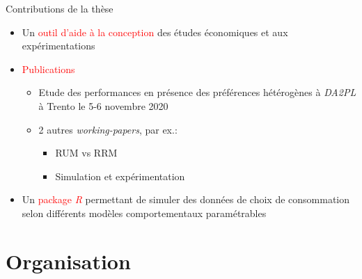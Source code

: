 \documentclass[11pt,ignorenonframetext,]{beamer}
\providecommand{\tightlist}{%
  \setlength{\itemsep}{0pt}\setlength{\parskip}{0pt}}
\begin{document}
\begin{frame}{Contributions de la thèse}
\protect\hypertarget{contributions-de-la-these}{}

\begin{itemize}
\tightlist
\item
  Un \textcolor{red}{outil d'aide à la conception} des études
  économiques et aux expérimentations
\item
  \textcolor{red}{Publications}

  \begin{itemize}
  \tightlist
  \item
    Etude des performances en présence des préférences hétérogènes à
    \emph{DA2PL} à Trento le 5-6 novembre 2020
  \item
    2 autres \emph{working-papers}, par ex.:

    \begin{itemize}
    \tightlist
    \item
      RUM vs RRM
    \item
      Simulation et expérimentation
    \end{itemize}
  \end{itemize}
\item
  Un \textcolor{red}{package \textit{R}} permettant de simuler des
  données de choix de consommation selon différents modèles
  comportementaux paramétrables
\end{itemize}

\end{frame}

\hypertarget{organisation}{%
\section{Organisation}\label{organisation}}
\end{document}
